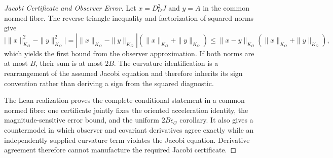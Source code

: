 \begin{proof}[Jacobi Certificate and Observer Error]
\label{proof:bk4_geodesic_failure}
Let $x=D_O^2J$ and $y=A$ in the common normed fibre.  The reverse triangle
inequality and factorization of squared norms give
\[
 \bigl|\|x\|_{K_O}^2-\|y\|_{K_O}^2\bigr|
 =|\|x\|_{K_O}-\|y\|_{K_O}|(\|x\|_{K_O}+\|y\|_{K_O})
 \leq \|x-y\|_{K_O}(\|x\|_{K_O}+\|y\|_{K_O}),
\]
which yields the first bound from the observer approximation.  If both norms
are at most $B$, their sum is at most $2B$.  The curvature identification is a
rearrangement of the assumed Jacobi equation and therefore inherits its sign
convention rather than deriving a sign from the squared diagnostic.

The Lean realization proves the complete conditional statement in a common
normed fibre: one certificate jointly fixes the oriented acceleration identity,
the magnitude-sensitive error bound, and the uniform $2B\epsilon_{\mathcal O}$
corollary.  It also gives a countermodel in which observer and covariant derivatives agree
exactly while an independently supplied curvature term violates the Jacobi
equation.  Derivative agreement therefore cannot manufacture the required
Jacobi certificate.
\end{proof}

